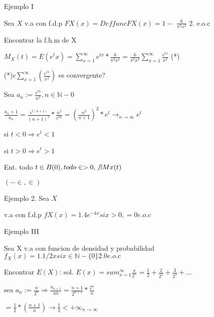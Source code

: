 \documentclass{article}
\begin{document}
Ejemplo I

Sea $X$ v.a con f.d.p
$FX(x)=Deffunc FX(x)= 1-$ $\frac{6}{\pi ^2 x^2}$ 2. e.o.c


Encontrar la f.h.m de X

$M_X(t)=E(e^tx)=\sum_{x=1}^{\infty}e^{tx} *\frac{6}{\pi ^2 x^2}=\frac{6}{\pi ^2 x^2}\sum_{x=1}^{\infty}\frac{e^{tx}}{x^2}$ (*)

(*)$c \sum_{x=1}^{\infty}(\frac{e^{tx}}{x^2})$ es convergente?

Sea $a_{n}:= \frac{e^{tn}}{n^2} , n\in \mathbb{N}-{0}$

$\frac{a_{n}+1}{a_{n}}= \frac{e^{t(n+1)}}{(n+1)^2} * \frac{n^2}{e^{tn}}=(\frac{n^2}{n+1})^2 * e^t \rightarrow _{n\rightarrow \infty} e^t$

si $t<0 \Rightarrow e^t<1$

si $t>0 \Rightarrow e^t>1$

Ent. todo $t\in B (0), todo \in>0, \not\exists Mx(t)$

$(-\in,\in)$

Ejemplo 2. Sea $X$ 



v.a con f.d.p $fX(x)=1.4e^{-4x} si x>0, =0 e. o. c$


Ejemplo III

Sea X v.a con funcion de densidad y probabilidad $f_{X}(x)=1.1/2x si x\in\mathbb{N}-\{0\} 2. 0 e.o.c$

Encontrar $E(X)$:
sol.
$E(x)=sum_{x=1}^{\infty}\frac{x}{2^x}= \frac{1}{2}+\frac{2}{2^2}+\frac{3}{2^3}+...$

sea $a_{n}:=\frac{n}{2^n}\Rightarrow \frac {a_{n+1}}{an}=\frac{n+1}{2^{n+1}}*\frac{2^n}{n}$

$=\frac{1}{2} * (\frac{n+1}{n})\rightarrow \frac{1}{2}<+\infty_{n\rightarrow\infty}$
\end{document}
